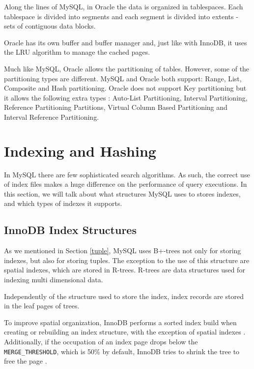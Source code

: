 \documentclass[12pt]{article}
\begin{document}
Along the lines of MySQL, in Oracle the data is organized in tablespaces. Each tablespace is divided into segments and each segment is divided into extents - sets of contiguous data blocks.

Oracle has its own buffer and buffer manager and, just like with InnoDB, it uses the LRU algorithm to manage the cached pages.

Much like MySQL, Oracle allows the partitioning of tables. However, some of the partitioning types are different. MySQL and Oracle both support: Range, List, Composite and Hash partitioning. Oracle does not support Key partitioning but it allows the following extra types \parencite{OraclePartitioning}: Auto-List Partitioning, Interval Partitioning, Reference Partitioning Partitions, Virtual Column Based Partitioning and Interval Reference Partitioning.





\newpage
\section{Indexing and Hashing}
\label{indexingHashing}
In MySQL there are few sophisticated search algorithms. As such, the correct use of index files makes a huge difference on the performance of query executions. In this section, we will talk about what structures MySQL uses to stores indexes, and which types of indexes it supports. 


\subsection{InnoDB Index Structures}
\label{IndexStructures}
As we mentioned in Section \ref{tuple}, MySQL uses B+-trees not only for storing indexes, but also for storing tuples. The exception to the use of this structure are spatial indexes, which are stored in R-trees. R-trees are data structures used for indexing multi dimensional data. 

Independently of the structure used to store the index, index records are stored in the leaf pages of trees.

To improve spatial organization, InnoDB performs a sorted index build when creating or rebuilding an index structure, with the exception of spatial indexes \parencite{SortedIndexBuilds}. Additionally, if the occupation of an index page drops below the \verb|MERGE_THRESHOLD|, which is 50\% by default, InnoDB tries to shrink the tree to free the page \parencite{PhysicalStructIndex}.
\end{document}

